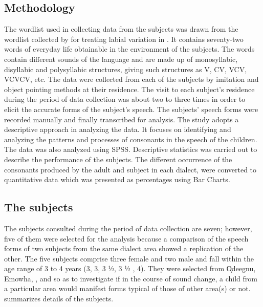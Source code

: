\documentclass[output=paper,
modfonts
]{langscibook}
\begin{document}
\subsection{Methodology}\label{sec:alerechi:5}

The wordlist used in collecting data from the subjects was drawn from the wordlist collected by \citet{Alerechi2007b} for treating labial variation in . It contains seventy-two words of everyday life obtainable in the environment of the subjects. The words contain different sounds of the language and are made up of monosyllabic, disyllabic and polysyllabic structures, giving such structures as V, CV, VCV, VCVCV, etc. The data were collected from each of the subjects by imitation and object pointing methods at their residence. The visit to each subject’s residence during the period of data collection was about two to three times in order to elicit the accurate forms of the subject’s speech. The subjects’ speech forms were recorded manually and finally transcribed for analysis. The study adopts a descriptive approach in analyzing the data. It focuses on identifying and analyzing the  patterns and processes of consonants in the speech of the  children. The data was also analyzed using SPSS. Descriptive statistics was carried out to describe the performance of the subjects. The different occurrence of the consonants produced by the adult and subject in each dialect, were converted to quantitative data which was presented as percentages using Bar Charts.

\subsection{The subjects}\label{sec:alerechi:1.6}

The subjects consulted during the period of data collection are seven; however, five of them were selected for the analysis because a comparison of the speech forms of two subjects from the same dialect area showed a replication of the other. The five subjects comprise three female and two male and fall within the age range of 3 to 4 years (3, 3, 3 ½, 3 ½ , 4). They were selected from O̩deegnu, Emowha, ,  and  so as to investigate if in the course of sound change, a child from a particular area would manifest forms typical of those of other area(s) or not.  summarizes details of the subjects. 
\end{document}
